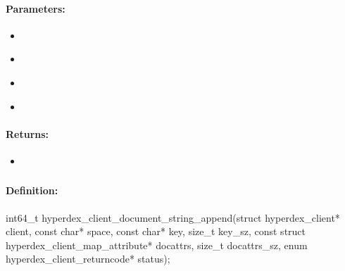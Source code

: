 \paragraph{Parameters:}
\begin{itemize}[noitemsep]
\item {}\\

\item {}\\

\item {}\\

\item {}\\

\end{itemize}

\paragraph{Returns:}
\begin{itemize}[noitemsep]
\item {}\\

\end{itemize}

\pagebreak
\subsubsection{}
\label{api:c:document_string_append}


\paragraph{Definition:}
\begin{ccode}
int64_t hyperdex_client_document_string_append(struct hyperdex_client* client,
        const char* space,
        const char* key, size_t key_sz,
        const struct hyperdex_client_map_attribute* docattrs, size_t docattrs_sz,
        enum hyperdex_client_returncode* status);
\end{ccode}

